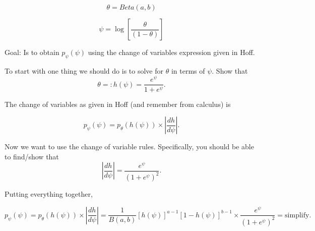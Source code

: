 \documentclass{article}
\begin{document}
\newpage

$$
\theta = Beta(a,b)
$$

$$
\psi = \log[\frac{\theta}{(1-\theta)}]
$$

Goal: Is to obtain $p_{\psi}(\psi)$ using the change of variables expression given in Hoff. 

To start with one thing we should do is to solve for $\theta$ in terms of $\psi.$
Show that $$\theta =: h(\psi) = \frac{e^{\psi}}{1 + e^{\psi}}.$$

The change of variables as given in Hoff (and remember from calculus) is 

$$p_{\psi}(\psi) = p_{\theta}(h(\psi)) \times |\frac{dh}{d\psi}|.$$

Now we want to use the change of variable rules. Specifically, you should be able to find/show that
$$|\frac{dh}{d\psi}| = \frac{e^{\psi}}{(1 + e^{\psi})^2
}.$$

Putting everything together,


$$p_{\psi}(\psi) = p_{\theta}(h(\psi)) \times |\frac{dh}{d\psi}|
= \frac{1}{B(a,b)} [h(\psi)]^{a-1} [1- h(\psi)]^{b-1} \times \frac{e^{\psi}}{(1 + e^{\psi})^2} = \text{simplify.}
$$
\end{document}
